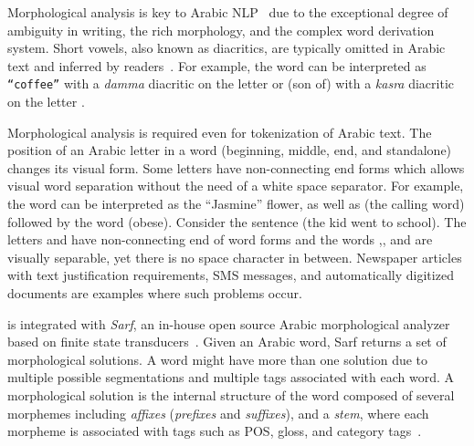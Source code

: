 \vocalize

\def\pp{\ensuremath{{\cal P}}} %
\def\ss{\ensuremath{{\cal S}}} %
\def\xx{\ensuremath{{\cal X}}} %
\def\PP{\ensuremath{\mathit{POS}}} %
\def\GG{\ensuremath{\mathit{GLOSS}}} %
\def\AC{\ensuremath{\mathit{CAT}}} %

Morphological analysis is key to Arabic NLP~\cite{arabicmorph} 
due to the exceptional degree of ambiguity in writing, 
the rich morphology, and the complex word derivation system. 
Short vowels, also known as diacritics, are typically omitted in Arabic text
and inferred by readers~\cite{habash2006arabic}. 
For example, the word %
can be interpreted as  {\tt ``coffee''} with a {\em damma} diacritic on the 
letter  or 
\vocalize {} (son of) with a 
{\em kasra} diacritic on the letter .

Morphological analysis is required even for tokenization of Arabic text. 
The position of an Arabic letter in a word 
(beginning, middle, end, and standalone) changes
its visual form.
Some letters have non-connecting end forms which allows visual
word separation without the need of a white space separator. 
For example, the word  can be interpreted as
the ``Jasmine'' flower, 
as well as  (the calling word) followed by
the word  (obese). 
Consider the sentence 
\arabfalse {} \arabtrue
(the kid went to school). 
The letters  and  have 
non-connecting end of word forms and the words 
,, and 
are visually separable, 
yet there is no space character in between.
Newspaper articles with text justification requirements, 
SMS messages, and automatically digitized documents
are examples where such problems occur. 

\framework is integrated with {\em Sarf}, 
an in-house open source Arabic morphological analyzer based on 
finite state transducers~\cite{ZaMaColing2012DemosSarf}. 
Given an Arabic word, Sarf returns 
a set of morphological solutions. 
A word might have more than one solution 
due to multiple possible segmentations and multiple tags associated 
with each word. 
A morphological solution is the internal structure of the word 
composed of several morphemes including 
{\em affixes} ({\em prefixes} and {\em suffixes}), and a
{\em stem}, where each morpheme is associated with tags such as 
POS, gloss, and category tags~\cite{arabicmorph,habash2010introduction}.

